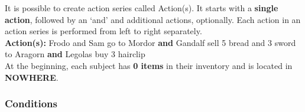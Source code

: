 \documentclass[12pt]{article}
\begin{document}
\noindent It is possible to create action series called Action(s). It starts with a \textbf{single action}, followed by an `and' and additional actions, optionally. Each action in an action series is performed from left to right separately.\\

\noindent \textbf{Action(s):} Frodo and Sam go to Mordor \textbf{and} Gandalf sell 5 bread and 3 sword to Aragorn \textbf{and} Legolas buy 3 hairclip\\

\noindent At the beginning, each subject has \textbf{0 items} in their inventory and is located in \textbf{NOWHERE}. 

\subsubsection{Conditions}
\end{document}
